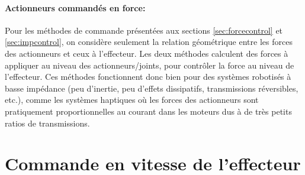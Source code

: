 \paragraph{Actionneurs commandés en force:} Pour les méthodes de commande présentées aux sections \ref{sec:forcecontrol} et \ref{sec:impcontrol}, on considère seulement la relation géométrique entre les forces des actionneurs et ceux à l'effecteur. Les deux méthodes calculent des forces à appliquer au niveau des actionneurs/joints, pour contrôler la force au niveau de l'effecteur. Ces méthodes fonctionnent donc bien pour des systèmes robotisés à basse impédance (peu d'inertie, peu d'effets dissipatifs, transmissions réversibles, etc.), comme les systèmes haptiques où les forces des actionneurs sont pratiquement proportionnelles au courant dans les moteurs dus à de très petits ratios de transmissions.



\newpage
\section{Commande en vitesse de l'effecteur}
\label{sec:speedcontrol}

